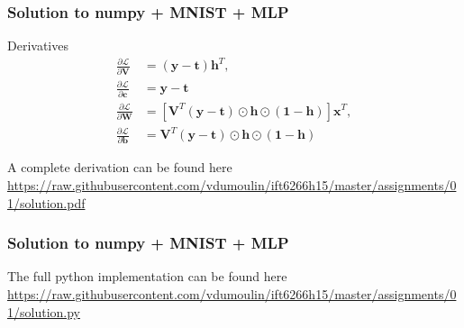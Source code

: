 \documentclass[mathserif, xcolor=dvipsnames]{beamer}
\begin{document}
\begin{frame}
    \frametitle{Solution to numpy + MNIST + MLP}

    \begin{block}{Derivatives}
    \begin{equation*}
    \begin{split}
        \frac{\partial \mathcal{L}}{\partial \mathbf{V}}
            &= (\mathbf{y} - \mathbf{t}) \mathbf{h}^T, \\
        \frac{\partial \mathcal{L}}{\partial \mathbf{c}}
            &= \mathbf{y} - \mathbf{t} \\
        \frac{\partial \mathcal{L}}{\partial \mathbf{W}}
            &= [\mathbf{V}^T(\mathbf{y} - \mathbf{t}) \odot \mathbf{h} \odot
                (\mathbf{1} - \mathbf{h})] \mathbf{x}^T, \\
        \frac{\partial \mathcal{L}}{\partial \mathbf{b}}
            &= \mathbf{V}^T(\mathbf{y} - \mathbf{t}) \odot \mathbf{h} \odot
               (\mathbf{1} - \mathbf{h})
    \end{split}
    \end{equation*}
    \end{block}

    \begin{alertblock}{A complete derivation can be found here}
    \url{https://raw.githubusercontent.com/vdumoulin/ift6266h15/master/assignments/01/solution.pdf}
    \end{alertblock}
\end{frame}

\begin{frame}
    \frametitle{Solution to numpy + MNIST + MLP}

    \begin{alertblock}{The full python implementation can be found here}
    \url{https://raw.githubusercontent.com/vdumoulin/ift6266h15/master/assignments/01/solution.py}
    \end{alertblock}
\end{frame}
\end{document}
